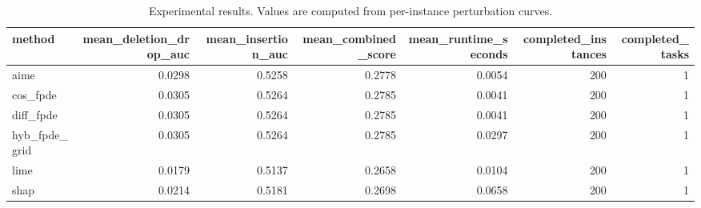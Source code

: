 \begin{table}[t]
\caption{Experimental results. Values are computed from per-instance perturbation curves.}
\label{tab:main_results_computed}
\centering
\begin{tabular}{lrrrrrr}
\toprule
method & mean\_deletion\_drop\_auc & mean\_insertion\_auc & mean\_combined\_score & mean\_runtime\_seconds & completed\_instances & completed\_tasks \\
\midrule
aime & 0.0298 & 0.5258 & 0.2778 & 0.0054 & 200 & 1 \\
cos\_fpde & 0.0305 & 0.5264 & 0.2785 & 0.0041 & 200 & 1 \\
diff\_fpde & 0.0305 & 0.5264 & 0.2785 & 0.0041 & 200 & 1 \\
hyb\_fpde\_grid & 0.0305 & 0.5264 & 0.2785 & 0.0297 & 200 & 1 \\
lime & 0.0179 & 0.5137 & 0.2658 & 0.0104 & 200 & 1 \\
shap & 0.0214 & 0.5181 & 0.2698 & 0.0658 & 200 & 1 \\
\bottomrule
\end{tabular}

\end{table}
